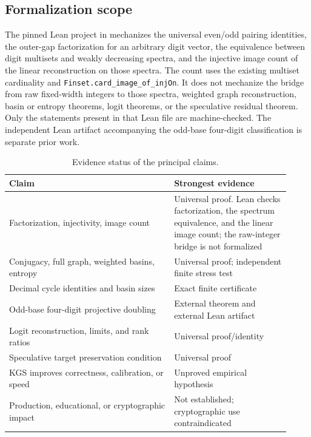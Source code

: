 \documentclass[11pt]{article}
\theoremstyle{definition}
\theoremstyle{remark}
\newcommand{\1}{\mathbf{1}}
\begin{document}
\subsection{Formalization scope}

The pinned Lean project in  mechanizes the universal
even/odd pairing identities, the outer-gap factorization for an arbitrary
digit vector, the equivalence between digit multisets and weakly decreasing
spectra, and the injective image count of the linear reconstruction on those
spectra.  The count uses the existing multiset cardinality and
\texttt{Finset.card\_image\_of\_injOn}.  It does not mechanize the bridge from
raw fixed-width integers to those spectra, weighted graph reconstruction,
basin or entropy theorems, logit theorems, or the speculative residual
theorem.  Only the statements present in that Lean file are machine-checked.
The independent Lean artifact accompanying the odd-base four-digit
classification \cite{chenkaprekar2026} is separate prior work.

\begin{table}[ht]
\centering
\caption{Evidence status of the principal claims.}
\label{tab:evidence}
\small
\begin{tabular}{@{}p{0.54\linewidth}p{0.38\linewidth}@{}}
\toprule
Claim & Strongest evidence \\
\midrule
Factorization, injectivity, image count & Universal proof. Lean checks factorization, the spectrum equivalence, and the linear image count; the raw-integer bridge is not formalized \\
Conjugacy, full graph, weighted basins, entropy & Universal proof; independent finite stress test \\
Decimal cycle identities and basin sizes & Exact finite certificate \\
Odd-base four-digit projective doubling & External theorem and external Lean artifact \\
Logit reconstruction, limits, and rank ratios & Universal proof/identity \\
Speculative target preservation condition & Universal proof \\
KGS improves correctness, calibration, or speed & Unproved empirical hypothesis \\
Production, educational, or cryptographic impact & Not established; cryptographic use contraindicated \\
\bottomrule
\end{tabular}
\end{table}
\end{document}
